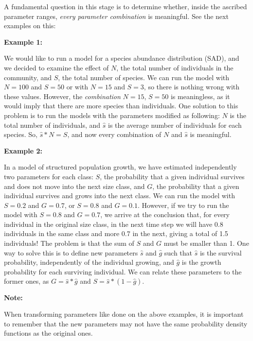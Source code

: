 \documentclass[12pt,a4paper]{article}
\begin{document}
\begin{shaded}
A fundamental question in this stage is to determine whether, inside the
ascribed parameter ranges, {\em every parameter combination} is meaningful.
See the next examples on this:

\textbf{Example 1:}

We would like to run a model for a species abundance distribution (SAD),
and we decided to examine the effect of $N$, the total number of individuals
in the community, and $S$, the total number of species. We can run the model with
$N=100$ and $S=50$ or with $N=15$ and $S=3$, so there is nothing wrong with these
values. However, the {\em combination} $N=15$, $S=50$ is meaningless, as it would
imply that there are more species than individuals. One solution to this problem
is to run the models with the parameters modified as following: $N$ is the total
number of individuals, and $\hat{s}$ is the average number of individuals for
each species. So, $\hat{s} * N = S$, and now every combination of $N$ and $\hat{s}$
is meaningful.

\textbf{Example 2:}

In a model of structured population growth, we have estimated independently
two parameters for each class: $S$, the probability that a given individual
survives and does not move into the next size class, and $G$, the probability
that a given individual survives and grows into the next class. We can run the
model with $S=0.2$ and $G=0.7$, or $S=0.8$ and $G=0.1$. However, if we try to
run the model with $S=0.8$ and $G=0.7$, we arrive at the conclusion that, for
every individual in the original size class, in the next time step we will have 
0.8 individuals in the same class and more 0.7 in the next, giving a total of 1.5
individuals! The problem is that the sum of $S$ and $G$ must be smaller than 1.
One way to solve this is to define new parameters $\hat{s}$ and $\hat{g}$ such 
that $\hat{s}$ is the survival probability, independently of the individual growing,
and $\hat{g}$ is the growth probability for each surviving individual.
We can relate these parameters to the former ones, as $G = \hat{s}*\hat{g}$ and
$S = \hat{s} * (1-\hat{g})$.

\textbf{Note:}

When transforming parameters like done on the above examples, it is important
to remember that the new parameters may not have the same probability density
functions as the original ones. 

\end{shaded}
\end{document}
